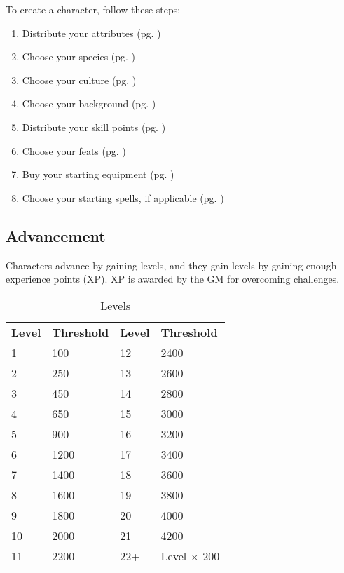 \begin{multicols}{2}
    To create a character, follow these steps:
    \begin{enumerate}
        \item Distribute your attributes (pg. \pageref{attributes})
        \item Choose your species (pg. \pageref{species})
        \item Choose your culture (pg. \pageref{culture})
        \item Choose your background (pg. \pageref{background})
        \item Distribute your skill points (pg. \pageref{skills})
        \item Choose your feats (pg. \pageref{feats})
        \item Buy your starting equipment (pg. \pageref{equipment})
        \item Choose your starting spells, if applicable (pg. \pageref{magic})
    \end{enumerate}

    \subsection{Advancement}
    Characters advance by gaining levels, and they gain levels by gaining enough
    experience points (XP). XP is awarded by the GM for overcoming challenges.
    \begin{table*}[ht]
        \unclassedrowcolors
        \begin{tabularx}{\textwidth}{l X l X}
            \textbf{Level} & \textbf{Threshold} & \textbf{Level} & \textbf{Threshold} \\
            1 & 100 & 12 & 2400 \\
            2 & 250 & 13 & 2600 \\
            3 & 450 & 14 & 2800 \\
            4 & 650 & 15 & 3000 \\
            5 & 900 & 16 & 3200 \\
            6 & 1200 & 17 & 3400 \\
            7 & 1400 & 18 & 3600 \\
            8 & 1600 & 19 & 3800 \\
            9 & 1800 & 20 & 4000 \\
            10 & 2000 & 21 & 4200 \\
            11 & 2200 & 22+ & Level $\times$ 200 \\
        \end{tabularx}
        \caption{Levels}
        \label{tab:levels}
    \end{table*}


\end{multicols}
